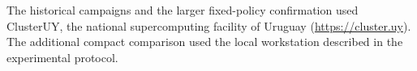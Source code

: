 The historical campaigns and the larger fixed-policy confirmation used
ClusterUY, the national supercomputing facility of Uruguay
(\url{https://cluster.uy}). The additional compact comparison used the local
workstation described in the experimental protocol.
